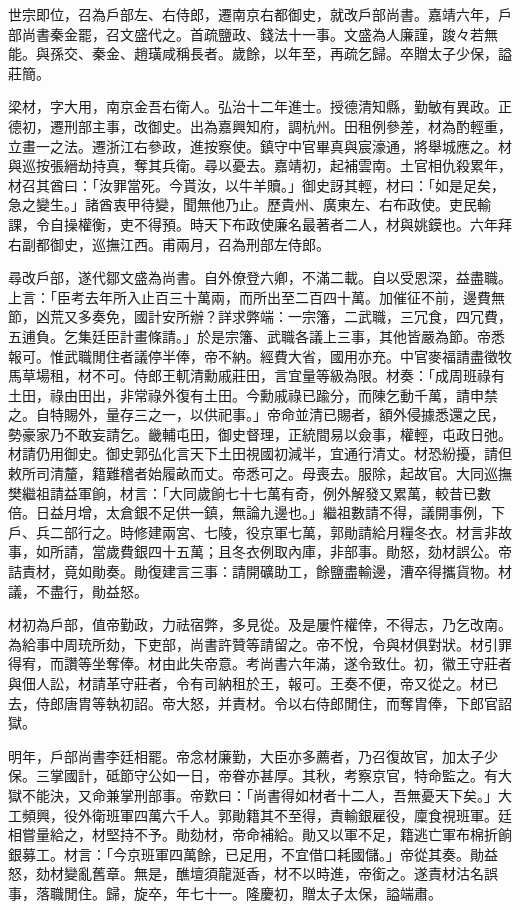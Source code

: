 \begin{pinyinscope}
世宗即位，召為戶部左、右侍郎，遷南京右都御史，就改戶部尚書。嘉靖六年，戶部尚書秦金罷，召文盛代之。首疏鹽政、錢法十一事。文盛為人廉謹，踆々若無能。與孫交、秦金、趙璜咸稱長者。歲餘，以年至，再疏乞歸。卒贈太子少保，謚莊簡。

梁材，字大用，南京金吾右衛人。弘治十二年進士。授德清知縣，勤敏有異政。正德初，遷刑部主事，改御史。出為嘉興知府，調杭州。田租例參差，材為酌輕重，立畫一之法。遷浙江右參政，進按察使。鎮守中官畢真與宸濠通，將舉城應之。材與巡按張縉劫持真，奪其兵衛。尋以憂去。嘉靖初，起補雲南。土官相仇殺累年，材召其酋曰：「汝罪當死。今貰汝，以牛羊贖。」御史訝其輕，材曰：「如是足矣，急之變生。」諸酋衷甲待變，聞無他乃止。歷貴州、廣東左、右布政使。吏民輸課，令自操權衡，吏不得預。時天下布政使廉名最著者二人，材與姚鏌也。六年拜右副都御史，巡撫江西。甫兩月，召為刑部左侍郎。

尋改戶部，遂代鄒文盛為尚書。自外僚登六卿，不滿二載。自以受恩深，益盡職。上言：「臣考去年所入止百三十萬兩，而所出至二百四十萬。加催征不前，邊費無節，凶荒又多奏免，國計安所辦？詳求弊端：一宗籓，二武職，三冗食，四冗費，五逋負。乞集廷臣計畫條請。」於是宗籓、武職各議上三事，其他皆嚴為節。帝悉報可。惟武職閒住者議停半俸，帝不納。經費大省，國用亦充。中官麥福請盡徵牧馬草場租，材不可。侍郎王軏清勳戚莊田，言宜量等級為限。材奏：「成周班祿有土田，祿由田出，非常祿外復有土田。今勳戚祿已踰分，而陳乞動千萬，請申禁之。自特賜外，量存三之一，以供祀事。」帝命並清已賜者，額外侵據悉還之民，勢豪家乃不敢妄請乞。畿輔屯田，御史督理，正統間易以僉事，權輕，屯政日弛。材請仍用御史。御史郭弘化言天下土田視國初減半，宜通行清丈。材恐紛擾，請但敕所司清釐，籍難稽者始履畝而丈。帝悉可之。母喪去。服除，起故官。大同巡撫樊繼祖請益軍餉，材言：「大同歲餉七十七萬有奇，例外解發又累萬，較昔已數倍。日益月增，太倉銀不足供一鎮，無論九邊也。」繼祖數請不得，議開事例，下戶、兵二部行之。時修建兩宮、七陵，役京軍七萬，郭勛請給月糧冬衣。材言非故事，如所請，當歲費銀四十五萬；且冬衣例取內庫，非部事。勛怒，劾材誤公。帝詰責材，竟如勛奏。勛復建言三事：請開礦助工，餘鹽盡輸邊，漕卒得攜貨物。材議，不盡行，勛益怒。

材初為戶部，值帝勤政，力祛宿弊，多見從。及是屢忤權倖，不得志，乃乞改南。為給事中周珫所劾，下吏部，尚書許贊等請留之。帝不悅，令與材俱對狀。材引罪得宥，而讚等坐奪俸。材由此失帝意。考尚書六年滿，遂令致仕。初，徽王守莊者與佃人訟，材請革守莊者，令有司納租於王，報可。王奏不便，帝又從之。材已去，侍郎唐胄等執初詔。帝大怒，并責材。令以右侍郎閒住，而奪胄俸，下郎官詔獄。

明年，戶部尚書李廷相罷。帝念材廉勤，大臣亦多薦者，乃召復故官，加太子少保。三掌國計，砥節守公如一日，帝眷亦甚厚。其秋，考察京官，特命監之。有大獄不能決，又命兼掌刑部事。帝歎曰：「尚書得如材者十二人，吾無憂天下矣。」大工頻興，役外衛班軍四萬六千人。郭勛籍其不至得，責輸銀雇役，廩食視班軍。廷相嘗量給之，材堅持不予。勛劾材，帝命補給。勛又以軍不足，籍逃亡軍布棉折餉銀募工。材言：「今京班軍四萬餘，已足用，不宜借口耗國儲。」帝從其奏。勛益怒，劾材變亂舊章。無是，醮壇須龍涎香，材不以時進，帝銜之。遂責材沽名誤事，落職閒住。歸，旋卒，年七十一。隆慶初，贈太子太保，謚端肅。


\end{pinyinscope}
